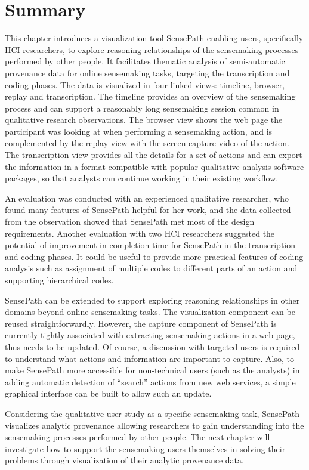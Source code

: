 \section{Summary}
This chapter introduces a visualization tool SensePath enabling users, specifically HCI researchers, to explore reasoning relationships of the sensemaking processes performed by other people. It facilitates thematic analysis of semi-automatic provenance data for online sensemaking tasks, targeting the transcription and coding phases. The data is visualized in four linked views: timeline, browser, replay and transcription. The timeline provides an overview of the sensemaking process and can support a reasonably long sensemaking session common in qualitative research observations. The browser view shows the web page the participant was looking at when performing a sensemaking action, and is complemented by the replay view with the screen capture video of the action. The transcription view provides all the details for a set of actions and can export the information in a format compatible with popular qualitative analysis software packages, so that analysts can continue working in their existing workflow.

An evaluation was conducted with an experienced qualitative researcher, who found many features of SensePath helpful for her work, and the data collected from the observation showed that SensePath met most of the design requirements. Another evaluation with two HCI researchers suggested the potential of improvement in completion time for SensePath in the transcription and coding phases. It could be useful to provide more practical features of coding analysis such as assignment of multiple codes to different parts of an action and supporting hierarchical codes. 

SensePath can be extended to support exploring reasoning relationships in other domains beyond online sensemaking tasks. The visualization component can be reused straightforwardly. However, the capture component of SensePath is currently tightly associated with extracting sensemaking actions in a web page, thus needs to be updated. Of course, a discussion with targeted users is required to understand what actions and information are important to capture.  Also, to make SensePath more accessible for non-technical users (such as the analysts) in adding automatic detection of ``search'' actions from new web services, a simple graphical interface can be built to allow such an update.

Considering the qualitative user study as a specific sensemaking task, SensePath visualizes analytic provenance allowing researchers to gain understanding into the sensemaking processes performed by other people. The next chapter will investigate how to support the sensemaking users themselves in solving their problems through visualization of their analytic provenance data.
